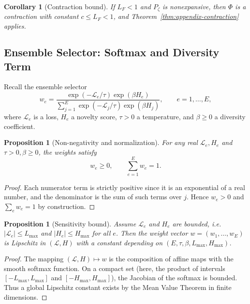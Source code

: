 \documentclass[11pt]{article}
\theoremstyle{definition}
\theoremstyle{plain}
\newtheorem{proposition}[definition]{Proposition}
\newtheorem{corollary}[definition]{Corollary}
\theoremstyle{remark}
\begin{document}
\begin{corollary}[Contraction bound]
\label{cor:appendix-contraction-bound}
If $L_F<1$ and $P_\zeta$ is nonexpansive, then $\Phi$ is a contraction with constant $c\le L_F<1$, and Theorem~\ref{thm:appendix-contraction} applies.
\end{corollary}

\subsection{Ensemble Selector: Softmax and Diversity Term}

Recall the ensemble selector
\[
w_e = \frac{\exp(-\mathcal{L}_e/\tau)\exp(\beta H_e)}
{\sum_{j=1}^E \exp(-\mathcal{L}_j/\tau)\exp(\beta H_j)},\qquad e=1,\dots,E,
\]
where $\mathcal{L}_e$ is a loss, $H_e$ a novelty score, $\tau>0$ a temperature, and $\beta\ge 0$ a diversity coefficient.

\begin{proposition}[Non-negativity and normalization]
\label{prop:appendix-softmax-normalization}
For any real $\mathcal{L}_e,H_e$ and $\tau>0,\beta\ge 0$, the weights satisfy
\[
w_e \ge 0,\qquad \sum_{e=1}^E w_e = 1.
\]
\end{proposition}

\begin{proof}
Each numerator term is strictly positive since it is an exponential of a real number, and the denominator is the sum of such terms over $j$. Hence $w_e>0$ and $\sum_e w_e = 1$ by construction.
\end{proof}

\begin{proposition}[Sensitivity bound]
\label{prop:appendix-softmax-lipschitz}
Assume $\mathcal{L}_e$ and $H_e$ are bounded, i.e.\ $|\mathcal{L}_e|\le L_{\max}$ and $|H_e|\le H_{\max}$ for all $e$. Then the weight vector $w=(w_1,\dots,w_E)$ is Lipschitz in $(\mathcal{L},H)$ with a constant depending on $(E,\tau,\beta,L_{\max},H_{\max})$.
\end{proposition}

\begin{proof}
The mapping $(\mathcal{L},H)\mapsto w$ is the composition of affine maps with the smooth softmax function. On a compact set (here, the product of intervals $[-L_{\max},L_{\max}]$ and $[-H_{\max},H_{\max}]$), the Jacobian of the softmax is bounded. Thus a global Lipschitz constant exists by the Mean Value Theorem in finite dimensions.
\end{proof}
\end{document}
